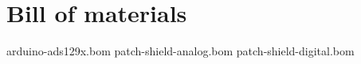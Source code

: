 \documentclass[11pt, letterpaper]{article}
\begin{document}


\section{Bill of materials}




arduino-ads129x.bom 
patch-shield-analog.bom 
patch-shield-digital.bom 
\end{document}
